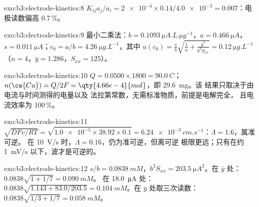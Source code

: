 \begin{solution}{exo:b3:electrode-kinetics:8}
$K_{ij}a_j/a_i = \num{2e-4} \times 0.14/\num{4.0e-3} = 0.007$：电极读数偏高 0.7\,\%。
\end{solution}

\begin{solution}{exo:b3:electrode-kinetics:9}
最小二乘法：$b = \qty{0.1093}{\micro A.L.\micro g^{-1}}$，$a = \qty{0.466}{\micro A}$，$s = \qty{0.011}{\micro A}$；$c_0 = a/b =
\qty{4.26}{\micro g.L^{-1}}$，其中 $u(c_0) = \frac sb\sqrt{\frac1n + \frac{\bar y^2}{b^2S_{xx}}} = \qty{0.12}{\micro g.L^{-1}}$
（$n = 4$，$\bar y = 1.286$，$S_{xx} = 125$）。
\end{solution}

\begin{solution}{exo:b3:electrode-kinetics:10}
$Q = 0.0500 \times 1800 = \qty{90.0}{C}$；$n(\ce{Cu}) = Q/2F = \qty{4.66e-4}{mol}$，即 \qty{29.6}{mg}。该
结果只取决于由电流与时间测得的电量以及
法拉第常数，无需标准物质，前提是电解完全，
且电流效率为 100\,\%。
\end{solution}

\begin{solution}{exo:b3:electrode-kinetics:11}
$\sqrt{DFv/RT} = \sqrt{\num{1.0e-5} \times 38.92 \times 0.1} = \qty{6.24e-3}{cm.s^{-1}}$：$\Lambda = 1.6$，属准可逆。
在 \qty{10}{V/s} 时，$\Lambda = 0.16$，仍为准可逆，但离可逆
极限更远；只有在约 \qty{1}{mV/s} 以下，波才是可逆的。
\end{solution}

\begin{solution}{exo:b3:electrode-kinetics:12}
$s/b = \qty{0.0838}{mM}$，$b^2S_{xx} = \qty{203.5}{\micro A^2}$。在 $\bar y$ 处：$0.0838\sqrt{1 + 1/7} = \qty{0.090}{mM}$。
在 \qty{18.0}{\micro A} 处：$0.0838\sqrt{1.143 + 83.0/203.5} = \qty{0.104}{mM}$。在 $\bar y$ 处取三次读数：
$0.0838\sqrt{1/3 + 1/7} = \qty{0.058}{mM}$。
\end{solution}

